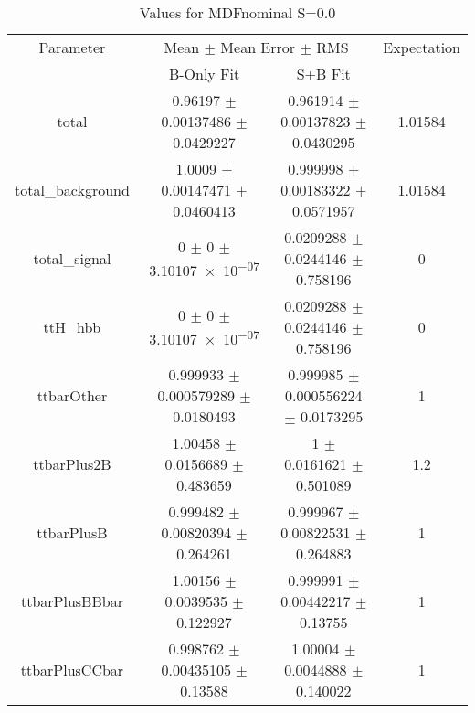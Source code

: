 \begin{table}
\centering
\caption{Values for MDFnominal S=0.0}
\begin{tabular}{cccc}
\toprule
Parameter & \multicolumn{2}{c}{Mean $\pm$ Mean Error $\pm$ RMS} & Expectation\\
 & B-Only Fit & S+B Fit & \\
\midrule
total & \num{0.96197} $\pm$ \num{0.00137486} $\pm$ \num{0.0429227} & \num{0.961914} $\pm$ \num{0.00137823} $\pm$ \num{0.0430295} & \num{1.01584}\\
total\_background & \num{1.0009} $\pm$ \num{0.00147471} $\pm$ \num{0.0460413} & \num{0.999998} $\pm$ \num{0.00183322} $\pm$ \num{0.0571957} & \num{1.01584}\\
total\_signal & \num{0} $\pm$ \num{0} $\pm$ \num{3.10107e-07} & \num{0.0209288} $\pm$ \num{0.0244146} $\pm$ \num{0.758196} & \num{0}\\
ttH\_hbb & \num{0} $\pm$ \num{0} $\pm$ \num{3.10107e-07} & \num{0.0209288} $\pm$ \num{0.0244146} $\pm$ \num{0.758196} & \num{0}\\
ttbarOther & \num{0.999933} $\pm$ \num{0.000579289} $\pm$ \num{0.0180493} & \num{0.999985} $\pm$ \num{0.000556224} $\pm$ \num{0.0173295} & \num{1}\\
ttbarPlus2B & \num{1.00458} $\pm$ \num{0.0156689} $\pm$ \num{0.483659} & \num{1} $\pm$ \num{0.0161621} $\pm$ \num{0.501089} & \num{1.2}\\
ttbarPlusB & \num{0.999482} $\pm$ \num{0.00820394} $\pm$ \num{0.264261} & \num{0.999967} $\pm$ \num{0.00822531} $\pm$ \num{0.264883} & \num{1}\\
ttbarPlusBBbar & \num{1.00156} $\pm$ \num{0.0039535} $\pm$ \num{0.122927} & \num{0.999991} $\pm$ \num{0.00442217} $\pm$ \num{0.13755} & \num{1}\\
ttbarPlusCCbar & \num{0.998762} $\pm$ \num{0.00435105} $\pm$ \num{0.13588} & \num{1.00004} $\pm$ \num{0.0044888} $\pm$ \num{0.140022} & \num{1}\\
\bottomrule
\end{tabular}
\end{table}